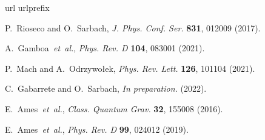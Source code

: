\documentclass{appolb}
\begin{document}
\begin{thebibliography}{99}

\expandafter\ifx\csname url\endcsname\relax
\def\url#1{\texttt{#1}}\fi
\expandafter\ifx\csname urlprefix\endcsname\relax\def\urlprefix{URL }\fi
\providecommand{\bibinfo}[2]{#2}
\providecommand{\eprint}[2][]{\url{#2}}

\bibinfo{author}{P.~Rioseco and O.~Sarbach,} %
\newblock \emph{\bibinfo{journal}{J. Phys. Conf. Ser.}}
\textbf{\bibinfo{volume}{831}}, 
\bibinfo{pages}{012009}
(\bibinfo{year}{2017}). 

\bibinfo{author}{A.~Gamboa}\emph{~et~al.}, 
\newblock \emph{\bibinfo{journal}{Phys. Rev. D}}
\textbf{\bibinfo{volume}{104}}, 
\bibinfo{pages}{083001}
(\bibinfo{year}{2021}). 

\bibinfo{author}{P.~Mach and A.~Odrzywo\l{}ek,} %
\newblock \emph{\bibinfo{journal}{Phys. Rev. Lett.}}
\textbf{\bibinfo{volume}{126}}, 
\bibinfo{pages}{101104}
(\bibinfo{year}{2021}). 

\bibinfo{author}{C.~Gabarrete and O.~Sarbach,} %
\newblock \emph{\bibinfo{journal}{In preparation.}}
(\bibinfo{year}{2022}). 

\bibinfo{author}{E.~Ames}\emph{~et~al.}, 
\newblock \emph{\bibinfo{journal}{Class. Quantum Grav.}}
\textbf{\bibinfo{volume}{32}}, 
\bibinfo{pages}{155008}
(\bibinfo{year}{2016}). 

\bibinfo{author}{E.~Ames}\emph{~et~al.}, 
\newblock \emph{\bibinfo{journal}{Phys. Rev. D}}
\textbf{\bibinfo{volume}{99}}, 
\bibinfo{pages}{024012}
(\bibinfo{year}{2019}). 


\end{thebibliography}
\end{document}
